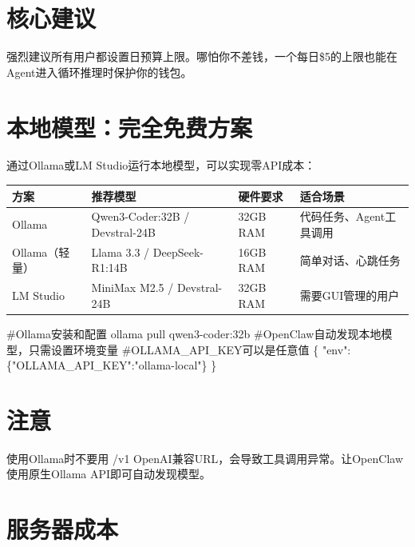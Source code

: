 \documentclass[
  10
]{article}
\newenvironment{Shaded}{}{}
\newcommand{\NormalTok}[1]{#1}
\newcounter{none} %
\begin{document}
\section{核心建议}\label{ux6838ux5fc3ux5efaux8bae-22}

强烈建议所有用户都设置日预算上限。哪怕你不差钱，一个每日\$5的上限也能在Agent进入循环推理时保护你的钱包。

\section{本地模型：完全免费方案}\label{ux672cux5730ux6a21ux578bux5b8cux5168ux514dux8d39ux65b9ux6848}

通过Ollama或LM Studio运行本地模型，可以实现零API成本：

{\def\LTcaptype{none} %
\begin{longtable}[]{@{}|l|l|l|l|@{}}
\toprule\noalign{}
\endhead
\bottomrule\noalign{}
\endlastfoot
\hline
方案 & 推荐模型 & 硬件要求 & 适合场景 \\
\hline
Ollama & Qwen3-Coder:32B / Devstral-24B & 32GB RAM &
代码任务、Agent工具调用 \\
\hline
Ollama（轻量） & Llama 3.3 / DeepSeek-R1:14B & 16GB RAM &
简单对话、心跳任务 \\
\hline
LM Studio & MiniMax M2.5 / Devstral-24B & 32GB RAM &
需要GUI管理的用户 \\
\hline
\end{longtable}
}

\begin{Shaded}
\begin{Highlighting}[]
\NormalTok{\#Ollama安装和配置  }
\NormalTok{ollama pull qwen3{-}coder:32b  }
\NormalTok{\#OpenClaw自动发现本地模型，只需设置环境变量  }
\NormalTok{\#OLLAMA\_API\_KEY可以是任意值  }
\NormalTok{\{ "env": \{"OLLAMA\_API\_KEY":"ollama{-}local"\} \}}
\end{Highlighting}
\end{Shaded}

\section{注意}\label{ux6ce8ux610f-27}

使用Ollama时不要用 /v1
OpenAI兼容URL，会导致工具调用异常。让OpenClaw使用原生Ollama
API即可自动发现模型。

\section{服务器成本}\label{ux670dux52a1ux5668ux6210ux672c}
\end{document}
